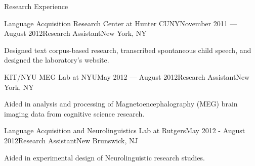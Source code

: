 \documentclass{resume} %
\begin{document}
\begin{rSection}{Research Experience}
\begin{rSubsection}{Language Acquisition Research Center at Hunter CUNY}{November 2011 --- August 2012}{Research Assistant}{New York, NY}
\item Designed text corpus-based research, transcribed spontaneous child speech, and designed the laboratory's website.
\end{rSubsection}

\begin{rSubsection}{KIT/NYU MEG Lab at NYU}{May 2012 --- August 2012}{Research Assistant}{New York, NY}
\item Aided in analysis and processing of Magnetoencephalography (MEG) brain imaging data from cognitive science research.
\end{rSubsection}

\begin{rSubsection}{Language Acquisition and Neurolinguistics Lab at Rutgers}{May 2012 - August 2012}{Research Assistant}{New Brunswick, NJ}
\item Aided in experimental design of Neurolinguistic research studies.
\end{rSubsection}

\end{rSection}


\vspace{.25cm}
\end{document}
